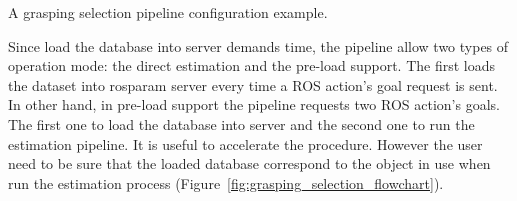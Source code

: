 \begin{snippet}[h!]
\centering
{}
\caption{A grasping selection pipeline configuration example.}
\label{code:selection_pipeline_ex}
\end{snippet}

Since load the database into server demands time, the pipeline allow two types of operation mode: the direct estimation and the pre-load support. The first loads the dataset into rosparam server every time a ROS action's goal request is sent. In other hand, in pre-load support the pipeline requests two ROS action's goals. The first one to load the database into server and the second one to run the estimation pipeline. It is useful to accelerate the procedure. However the user need to be sure that the loaded database correspond to the object in use when run the estimation process (Figure~\ref{fig:grasping_selection_flowchart}).

